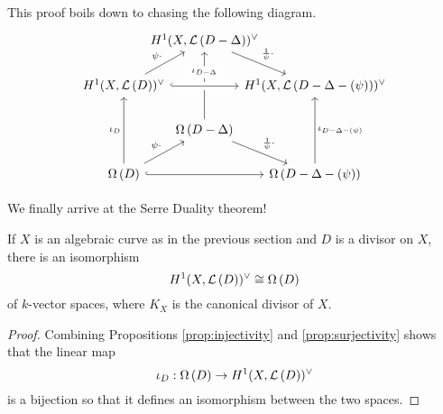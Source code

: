 \begin{cat}
  This proof boils down to chasing the following diagram.
  \[\begin{tikzcd}[column sep=-2em]
    & {\dual{D-\Delta}} \\
    {\dual{D}} && {\dual{D-\Delta-(\psi)}} \\
    & {\diffs{D-\Delta}} \\
    {\diffs{D}} && {\diffs{D-\Delta-(\psi)}}
    \arrow["\psi\cdot", from=2-1, to=1-2]
    \arrow["{\frac1{\psi}\cdot}", from=1-2, to=2-3]
    \arrow["\iota_D", from=4-1, to=2-1]
    \arrow["{\iota_{D-\Delta}}"{description, pos=0.7}, from=3-2, to=1-2]
    \arrow["\iota_{D-\Delta-(\psi)}"', from=4-3, to=2-3]
    \arrow[hook, crossing over, from=2-1, to=2-3]
    \arrow[hook, from=4-1, to=4-3]
    \arrow["\psi\cdot", from=4-1, to=3-2]
    \arrow["{\frac1{\psi}\cdot}", from=3-2, to=4-3]
  \end{tikzcd}\]
\end{cat}

We finally arrive at the Serre Duality theorem!
\begin{thm}\label{thm:serre}
  If $X$ is an algebraic curve as in the previous section
  and $D$ is a divisor on $X$, there is an isomorphism
  \[
    H^1(X,\mathcal{L}\left(D\right))^{\vee}\cong\Omega\left(D\right)
  \]
  of $k$-vector spaces, where $K_{X}$ is the canonical divisor of $X$.
\end{thm}
\begin{proof}
  Combining Propositions \ref{prop:injectivity} and \ref{prop:surjectivity}
  shows that the linear map
  \[\iota_{D}:\Omega\left(D\right)\to H^1(X,\mathcal{L}\left(D\right))^{\vee}\]
  is a bijection so that it defines an isomorphism between the two spaces.
\end{proof}
